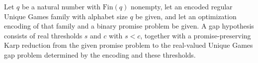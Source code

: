 \begin{definition}
\label{FABL.EncodedRegularUniqueGamesFamily.GapHypothesis}
\leanok
{}
Let $q$ be a natural number with $\mathrm{Fin}(q)$ nonempty, let an encoded regular
Unique Games family with alphabet size $q$ be given, and let an optimization encoding of
that family and a binary promise problem be given. A gap hypothesis consists of real
thresholds $s$ and $c$ with $s<c$, together with a promise-preserving Karp reduction
from the given promise problem to the real-valued Unique Games gap problem determined by
the encoding and these thresholds.
\end{definition}

